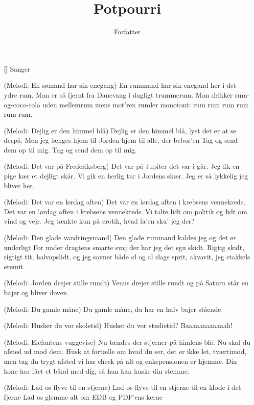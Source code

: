 \documentclass[a4paper,11pt]{article}
\title{Potpourri}
\author{Forfatter}
\begin{document}
\maketitle

\begin{roles}
[] Sanger
\end{roles}

\begin{song}
(Melodi: En sømand har sin enegang)
En rummand har sin enegand
her i det ydre rum.
Man er så fjernt fra Danevang
i dagligt trummerum.
Man drikker rum-og-coca-cola uden mellemrum
mens mot'ren rumler monotont:
rum rum rum rum rum rum.

(Melodi: Dejlig er den himmel blå)
Dejlig er den himmel blå,
lyst det er at se derpå.
Men jeg længes hjem til Jorden
hjem til alle, der bebor'en
Tag og send dem op til mig.
Tag og send dem op til mig.

(Melodi: Det var på Frederiksberg)
Det var på Jupiter
det var i går.
Jeg fik en pige kær
et dejligt skår.
Vi gik en herlig tur
i Jordens skær.
Jeg er så lykkelig
jeg bliver her.

(Melodi: Det var en lørdag aften)
Det var en lørdag aften
i krebsens vennekreds.
Det var en lørdag aften
i krebsens vennekreds.
Vi talte lidt om politik
og lidt om vind og vejr.
Jeg tænkte kun på erotik,
hvad fa'en sku' jeg der?

(Melodi: Den glade vandringsmand)
Den glade rummand kaldes jeg
og det er underligt
For under dragtens smarte svaj
der har jeg det sgu skidt.
Rigtig skidt,
rigtigt tit,
halvopslidt,
og jeg savner både øl og al slags sprit,
akvavit,
jeg stakkels eremit.

(Melodi: Jorden drejer stille rundt)
Venus drejer stille rundt
og på Saturn står en bajer og bliver doven

(Melodi: Du gamle måne)
Du gamle måne,
du har en halv bajer stående

(Melodi: Husker du vor skoletid)
Husker du vor studietid?  Baaaaaaaaaaaah!

(Melodi: Elefantens vuggevise)
Nu tændes der stjerner på himlens blå.
Nu skal du afsted ud mod dem.
Husk at fortælle om hvad du ser,
det er ikke let, tværtimod, men
tag du trygt afsted
vi har check på alt
og enkepensionen er hjemme.
Din kone har fået et bånd med dig,
så hun kan huske din stemme.

(Melodi: Lad os flyve til en stjerne)
Lad os flyve til en stjerne
til en klode i det fjerne
Lad os glemme alt om EDB
og PDP'ens kerne


\end{song}
\end{document}

